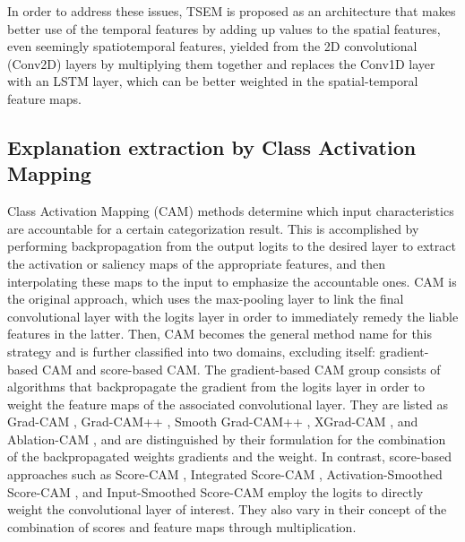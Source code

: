 \documentclass{svproc}
\begin{document}
In order to address these issues, TSEM is proposed as an architecture that makes better use of the temporal features by adding up values to the spatial features, even seemingly spatiotemporal features, yielded from the 2D convolutional (Conv2D) layers by multiplying them together and replaces the Conv1D layer with an LSTM layer, which can be better weighted in the spatial-temporal feature maps.

\subsection{Explanation extraction by Class Activation Mapping}
\label{sec:rel3}
Class Activation Mapping (CAM) methods determine which input characteristics are accountable for a certain categorization result. This is accomplished by performing backpropagation from the output logits to the desired layer to extract the activation or saliency maps of the appropriate features, and then interpolating these maps to the input to emphasize the accountable ones. CAM \cite{zhou2016learning} is the original approach, which uses the max-pooling layer to link the final convolutional layer with the logits layer in order to immediately remedy the liable features in the latter. Then, CAM becomes the general method name for this strategy and is further classified into two domains, excluding itself: gradient-based CAM and score-based CAM. The gradient-based CAM group consists of algorithms that backpropagate the gradient from the logits layer in order to weight the feature maps of the associated convolutional layer. They are listed as Grad-CAM \cite{selvaraju2017grad}, Grad-CAM++ \cite{chattopadhay2018grad}, Smooth Grad-CAM++ \cite{omeiza2019smooth}, XGrad-CAM \cite{fu2020axiom}, and Ablation-CAM \cite{ramaswamy2020ablation}, and are distinguished by their formulation for the combination of the backpropagated weights gradients and the weight. In contrast, score-based approaches such as Score-CAM \cite{wang2020score}, Integrated Score-CAM \cite{naidu2020cam}, Activation-Smoothed Score-CAM \cite{wang2020ss}, and Input-Smoothed Score-CAM \cite{wang2020ss} employ the logits to directly weight the convolutional layer of interest. They also vary in their concept of the combination of scores and feature maps through multiplication.
\end{document}
